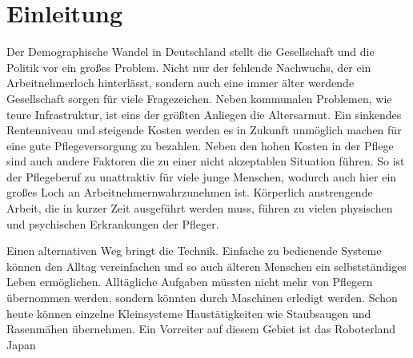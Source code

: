 \section{Einleitung}
\label{sec:einleitung}

Der Demographische Wandel in Deutschland stellt die Gesellschaft und die Politik vor ein großes Problem. Nicht nur der fehlende Nachwuchs, der ein Arbeitnehmerloch hinterlässt, sondern auch eine immer älter werdende Gesellschaft sorgen für viele Fragezeichen. Neben kommunalen Problemen, wie teure Infrastruktur, ist eins der größten Anliegen die Altersarmut. Ein sinkendes Rentenniveau und steigende Kosten werden es in Zukunft unmöglich machen für eine gute Pflegeversorgung zu bezahlen. \citep{brunozandonella2013} Neben den hohen Kosten in der Pflege sind auch andere Faktoren die zu einer nicht akzeptablen Situation führen. So ist der Pflegeberuf zu unattraktiv für viele junge Menschen, wodurch auch hier ein großes Loch an Arbeitnehmern\FemaleMale wahrzunehmen ist. Körperlich anstrengende Arbeit, die in kurzer Zeit ausgeführt werden muss, führen zu vielen physischen und psychischen Erkrankungen der Pfleger\FemaleMale .\citep{AOK2004}

Einen alternativen Weg bringt die Technik. Einfache zu bedienende Systeme können den Alltag vereinfachen und so auch älteren Menschen ein selbstständiges Leben ermöglichen. Alltägliche Aufgaben müssten nicht mehr von Pflegern übernommen werden, sondern könnten durch Maschinen erledigt werden. Schon heute können einzelne Kleinsysteme Haustätigkeiten wie Staubsaugen und Rasenmähen übernehmen. Ein Vorreiter auf diesem Gebiet ist das Roboterland Japan




